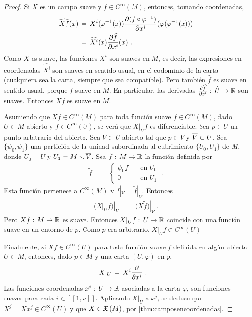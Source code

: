 \begin{proof}
	Si $X$ es un campo suave y $f\in C^{\infty}(M)$, entonces, tomando
	coordenadas,
	\begin{align*}
		\widehat{Xf}(x) & \,=\,X^{i}(\varphi^{-1}(x))
			\frac{\partial{(f\circ\varphi^{-1})}}{\partial{x^{i}}}
				(\varphi(\varphi^{-1}(x))) \\
		& \,=\, \widehat{X^{i}}(x)\frac{\partial{\widehat{f}}}{\partial{x^{i}}}(x)
		\text{ .}
	\end{align*}
	Como $X$ es suave, las funciones $X^{i}$ son suaves en $M$, es
	decir, las expresiones en coordenadas $\widehat{X^{i}}$ son suaves
	en sentido usual, en el codominio de la carta (cualquiera sea la
	carta, siempre que sea compatible). Pero tambi\'{e}n $\widehat{f}$
	es suave en sentido usual, porque $f$ suave en $M$. En particular,
	las derivadas $\derivada{\widehat{f}}{x^{i}}:\,%
	\widehat{U}\rightarrow\bb{R}$ son suaves. Entonces $Xf$ es suave
	en $M$.

	Asumiendo que $Xf\in C^{\infty}(M)$ para toda funci\'{o}n suave
	$f\in C^{\infty}(M)$, dado $U\subset M$ abierto y
	$f\in C^{\infty}(U)$, se ver\'{a} que $X|_{U}f$ es diferenciable.
	Sea $p\in U$ un punto arbitrario del abierto. Sea $V\subset U$
	abierto tal que $p\in V$ y $\overline{V}\subset U$. Sea
	$\{\psi_{0},\psi_{1}\}$ una partici\'{o}n de la unidad
	subordinada al cubrimiento $\{U_{0},U_{1}\}$ de $M$, donde
	$U_{0}=U$ y $U_{1}=M\smallsetminus\overline{V}$. Sea $\tilde{f}:\,%
	M\rightarrow\bb{R}$ la funci\'{o}n definida por
	\begin{align*}
		\tilde{f} & \,=\,
			\begin{cases}
				\psi_{0} f & \quad\text{en } U_{0} \\
				0 & \quad\text{en } U_{1}
			\end{cases}
		\text{ .}
	\end{align*}
	Esta funci\'{o}n pertenece a $C^{\infty}(M)$ y $f|_{V}=\tilde{f}|_{V}$.
	Entonces
	\begin{align*}
		\left.\big(X|_{U}f\big)\right|_{V} & \,=\,
			\left.\big(X\tilde{f}\big)\right|_{V}
		\text{ .}
	\end{align*}
	Pero $X\tilde{f}:\,M\rightarrow\mathbb{R}$ es suave. Entonces
	$X|_{U}f:\,U\rightarrow\mathbb{R}$ coincide con una funci\'{o}n
	suave en un entorno de $p$. Como $p$ era arbitrario,
	$X|_{U}f\in C^{\infty}(U)$.

	Finalmente, si $Xf\in C^{\infty}(U)$ para toda funci\'{o}n
	suave $f$ definida en alg\'{u}n abierto $U\subset M$, entonces,
	dado $p\in M$ y una carta $(U,\varphi)$ en $p$,
	\begin{align*}
		X|_{U} & \,=\, X^{i}\gancho{x^{i}}
		\text{ .}
	\end{align*}
	Las funciones coordenadas $x^{i}:\,U\rightarrow\mathbb{R}$ asociadas
	a la carta $\varphi$, son funciones suaves para cada
	$i\in[\![1,n]\!]$. Aplicando $X|_{U}$ a $x^{j}$, se deduce que
	$X^{j}=X x^{j}\in C^{\infty}(U)$ y que $X\in\mathfrak{X}\left(M\right)$,
	por \ref{thm:camposencoordenadas}.
\end{proof}


